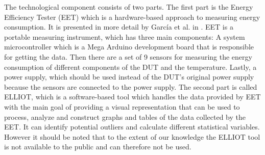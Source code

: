 The technological component consists of two parts. The first part is the Energy Efficiency Tester (EET) which is a hardware-based approach to measuring energy consumption. It is presented in more detail by García et al. in \cite*{GarciaEET}. EET is a portable measuring instrument, which has three main components: A system microcontroller which is a Mega Arduino development board that is responsible for getting the data. Then there are a set of 9 sensors for measuring the energy consumption of different components of the DUT and the temperature. Lastly, a power supply, which should be used instead of the DUT's original power supply because the sensors are connected to the power supply.\cite*{GarciaEET} The second part is called ELLIOT, which is a software-based tool which handles the data provided by EET with the main goal of providing a visual representation that can be used to process, analyze and construct graphs and tables of the data collected by the EET. It can identify potential outliers and calculate different statistical variables.\cite{GarciaFEETINGS} However it should be noted that to the extent of our knowledge the ELLIOT tool is not available to the public and can therefore not be used.

